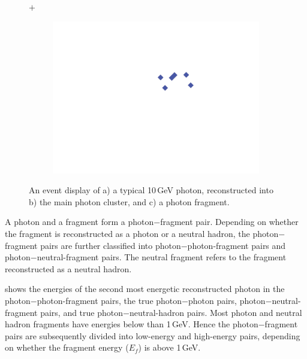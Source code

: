 \begin{figure}[tbph]
\begin{subfigure}[c]{0.3\textwidth}
    \caption{}
    \label{fig:photonEvtDspPhotonFragBig}
  \end{subfigure}
   {\LARGE$+$}%
  \begin{subfigure}[c]{0.3\textwidth}
    \includegraphics[width=\textwidth]{photon/small2}
    \caption{}
    \label{fig:photonEvtDspPhotonFragSmall}
  \end{subfigure}
\caption
{An event display of a) a typical 10\,GeV photon, reconstructed into  b) the main photon cluster,  and c) a photon fragment. }
\label{fig:photonEvtDspPhotonFrag}
\end{figure}




A photon and a fragment form a photon$-$fragment pair.  Depending on whether the fragment is reconstructed as a photon or a neutral hadron, the photon$-$fragment pairs are further classified into photon$-$photon-fragment pairs and photon$-$neutral-fragment pairs. The neutral fragment refers to the fragment reconstructed as a neutral hadron.

 shows the energies of the second most energetic reconstructed photon in the photon$-$photon-fragment pairs, the true photon$-$photon pairs, photon$-$neutral-fragment pairs, and true photon$-$neutral-hadron pairs. Most photon and neutral hadron fragments have energies below than 1\,GeV. Hence the photon$-$fragment pairs are subsequently  divided into low-energy and high-energy pairs, depending on whether the fragment energy ($E_f$) is above 1\,GeV.

